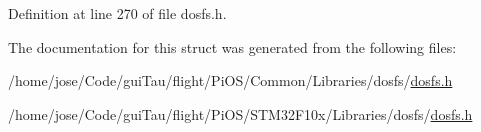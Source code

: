 Definition at line 270 of file dosfs.\-h.



The documentation for this struct was generated from the following files\-:\begin{DoxyCompactItemize}
\item 
/home/jose/\-Code/gui\-Tau/flight/\-Pi\-O\-S/\-Common/\-Libraries/dosfs/\hyperlink{_common_2_libraries_2dosfs_2dosfs_8h}{dosfs.\-h}\item 
/home/jose/\-Code/gui\-Tau/flight/\-Pi\-O\-S/\-S\-T\-M32\-F10x/\-Libraries/dosfs/\hyperlink{_s_t_m32_f10x_2_libraries_2dosfs_2dosfs_8h}{dosfs.\-h}\end{DoxyCompactItemize}
